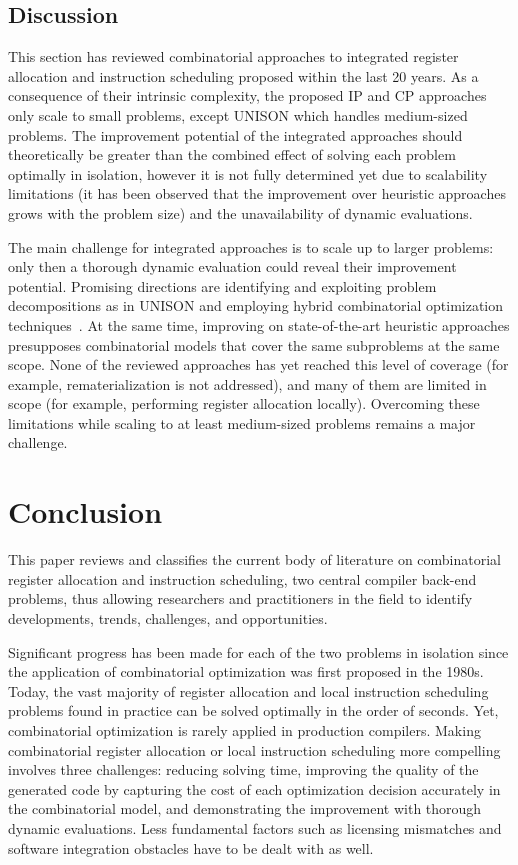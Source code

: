 \documentclass[acmsmall,authorversion,nonacm]{acmart}
\begin{document}
\subsection{Discussion}
\label{sec:integrated-discussion}

This section has reviewed combinatorial approaches to integrated
register allocation and instruction scheduling proposed within the
last 20 years.
As a consequence of their intrinsic complexity, the proposed IP and CP
approaches only scale to small problems, except UNISON which handles
medium-sized problems.
The improvement potential of the integrated approaches should
theoretically be greater than the combined effect of solving each
problem optimally in isolation, however it is not fully determined yet
due to scalability limitations (it has been observed that the
improvement over heuristic approaches grows with the problem size) and
the unavailability of dynamic evaluations.

The main challenge for integrated approaches is to scale up to larger
problems: only then a thorough dynamic evaluation could reveal their
improvement potential.
Promising directions are identifying and exploiting problem
decompositions as in UNISON and employing hybrid combinatorial
optimization techniques~\cite{CPH:local,CPH:or}.
At the same time, improving on state-of-the-art heuristic approaches
presupposes combinatorial models that cover the same subproblems at
the same scope.
None of the reviewed approaches has yet reached this level of coverage
(for example, rematerialization is not addressed), and many of them
are limited in scope (for example, performing register allocation
locally).
Overcoming these limitations while scaling to at least medium-sized
problems remains a major challenge.

\section{Conclusion}\label{sec:conclusion}

This paper reviews and classifies the current body of literature on
combinatorial register allocation and instruction scheduling, two
central compiler back-end problems, thus allowing researchers and
practitioners in the field to identify developments, trends,
challenges, and opportunities.

Significant progress has been made for each of the two problems in
isolation since the application of combinatorial optimization was
first proposed in the 1980s.
Today, the vast majority of register allocation and local instruction
scheduling problems found in practice can be solved optimally in the
order of seconds.
Yet, combinatorial optimization is rarely applied in production
compilers.
Making combinatorial register allocation or local instruction
scheduling more compelling involves three challenges: reducing solving
time, improving the quality of the generated code by capturing the
cost of each optimization decision accurately in the combinatorial
model, and demonstrating the improvement with thorough dynamic
evaluations.
Less fundamental factors such as licensing mismatches and software
integration obstacles have to be dealt with as well.
\end{document}
